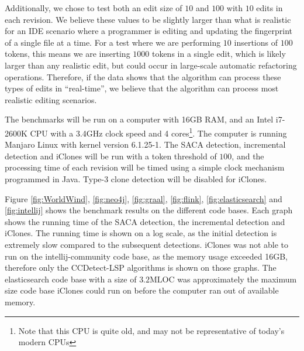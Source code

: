 Additionally, we chose to test both an edit size of $10$ and $100$ with $10$ edits in each
revision. We believe these values to be slightly larger than what is realistic for an IDE
scenario where a programmer is editing and updating the fingerprint of a single file at a
time. For a test where we are performing $10$ insertions of $100$ tokens, this means we
are inserting $1000$ tokens in a single edit, which is likely larger than any realistic
edit, but could occur in large-scale automatic refactoring operations. Therefore, if the
data shows that the algorithm can process these types of edits in ``real-time'', we believe
that the algorithm can process most realistic editing scenarios.

The benchmarks will be run on a computer with 16GB RAM, and an Intel i7-2600K CPU with a
3.4GHz clock speed and 4 cores\footnote{Note that this CPU is quite old, and may not be
representative of today's modern CPUs}. The computer is running Manjaro Linux with kernel
version 6.1.25-1. The SACA detection, incremental detection and iClones will be run with a
token threshold of $100$, and the processing time of each revision will be timed using a
simple clock mechanism programmed in Java. Type-3 clone detection will be disabled for
iClones.



Figure \ref{fig:WorldWind}, \ref{fig:neo4j}, \ref{fig:graal}, \ref{fig:flink},
\ref{fig:elasticsearch} and \ref{fig:intellij} shows the benchmark results on the
different code bases. Each graph shows the running time of the SACA detection, the
incremental detection and iClones. The running time is shown on a log scale, as the
initial detection is extremely slow compared to the subsequent detections. iClones was not
able to run on the intellij-community code base, as the memory usage exceeded 16GB,
therefore only the CCDetect-LSP algorithms is shown on those graphs. The elasticsearch
code base with a size of $3.2\text{MLOC}$ was approximately the maximum size code base
iClones could run on before the computer ran out of available memory.


